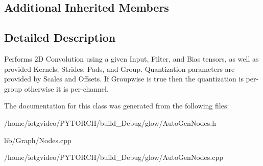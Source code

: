 \subsection*{Additional Inherited Members}


\subsection{Detailed Description}
Performs 2D Convolution using a given Input, Filter, and Bias tensors, as well as provided Kernels, Strides, Pads, and Group. Quantization parameters are provided by Scales and Offsets. If Groupwise is true then the quantization is per-\/group otherwise it is per-\/channel. 

The documentation for this class was generated from the following files\+:\begin{DoxyCompactItemize}
\item 
/home/iotgvideo/\+P\+Y\+T\+O\+R\+C\+H/build\+\_\+\+Debug/glow/Auto\+Gen\+Nodes.\+h\item 
lib/\+Graph/Nodes.\+cpp\item 
/home/iotgvideo/\+P\+Y\+T\+O\+R\+C\+H/build\+\_\+\+Debug/glow/Auto\+Gen\+Nodes.\+cpp\end{DoxyCompactItemize}
